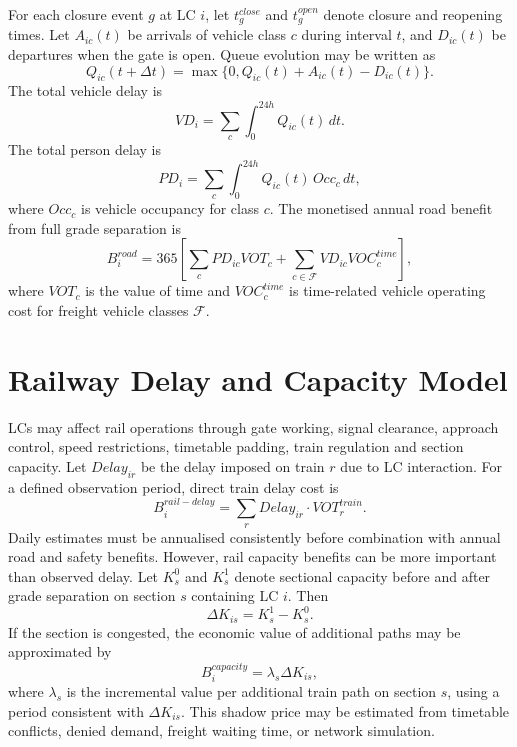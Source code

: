 \documentclass[11pt,a4paper]{article}
\begin{document}
For each closure event $g$ at LC $i$, let $t_g^{close}$ and $t_g^{open}$ denote closure and reopening times. Let $A_{ic}(t)$ be arrivals of vehicle class $c$ during interval $t$, and $D_{ic}(t)$ be departures when the gate is open. Queue evolution may be written as
\begin{equation}
Q_{ic}(t+\Delta t)=\max\{0,Q_{ic}(t)+A_{ic}(t)-D_{ic}(t)\}.
\end{equation}
The total vehicle delay is
\begin{equation}
VD_i = \sum_c \int_0^{24h} Q_{ic}(t)\,dt.
\end{equation}
The total person delay is
\begin{equation}
PD_i = \sum_c \int_0^{24h} Q_{ic}(t)\,Occ_c\,dt,
\end{equation}
where $Occ_c$ is vehicle occupancy for class $c$. The monetised annual road benefit from full grade separation is
\begin{equation}
B_i^{road}=365\left[\sum_c PD_{ic}VOT_c + \sum_{c\in\mathcal{F}}VD_{ic}VOC_c^{time}\right],
\end{equation}
where $VOT_c$ is the value of time and $VOC_c^{time}$ is time-related vehicle operating cost for freight vehicle classes $\mathcal{F}$.

\section{Railway Delay and Capacity Model}

LCs may affect rail operations through gate working, signal clearance, approach control, speed restrictions, timetable padding, train regulation and section capacity. Let $Delay_{ir}$ be the delay imposed on train $r$ due to LC interaction. For a defined observation period, direct train delay cost is
\begin{equation}
B_i^{rail-delay}=\sum_r Delay_{ir} \cdot VOT_r^{train}.
\end{equation}
Daily estimates must be annualised consistently before combination with annual road and safety benefits. However, rail capacity benefits can be more important than observed delay. Let $K_s^0$ and $K_s^1$ denote sectional capacity before and after grade separation on section $s$ containing LC $i$. Then
\begin{equation}
\Delta K_{is}=K_s^1-K_s^0.
\end{equation}
If the section is congested, the economic value of additional paths may be approximated by
\begin{equation}
B_i^{capacity}=\lambda_s \Delta K_{is},
\end{equation}
where $\lambda_s$ is the incremental value per additional train path on section $s$, using a period consistent with $\Delta K_{is}$. This shadow price may be estimated from timetable conflicts, denied demand, freight waiting time, or network simulation.
\end{document}
